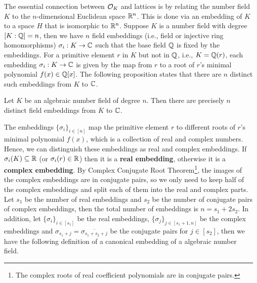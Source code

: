 \documentclass[../main.tex]{subfiles}
\begin{document}
The essential connection between $\mathcal{O}_K$ and lattices is by relating the number field $K$ to the $n$-dimensional Euclidean space $\mathbb{R}^n$. This is done via an embedding of $K$ to a space $H$ that is isomorphic to $\mathbb{R}^n$. Suppose $K$ is a number field with degree $[K:\mathbb{Q}]=n$, then we have $n$ field embeddings (i.e., field or injective ring homomorphisms) $\sigma_i: K \rightarrow \mathbb{C}$ such that the base field $\mathbb{Q}$ is fixed by the embeddings. For a primitive element $r$ in $K$ but not in $\mathbb{Q}$, i.e., $K=\Q(r)$, each embedding $\sigma_i: K \rightarrow \mathbb{C}$ is given by the map from $r$ to a root of $r$'s minimal polynomial $f(x) \in \Q[x]$. The following proposition states that there are $n$ distinct such embeddings from $K$ to $\mathbb{C}$. 

\iffalse
By definition of the embeddings, we have 
\begin{enumerate}
    \item for a number field $K=\Q(r)$, each embedding $\sigma_i$ is uniquely determined by its image $\sigma_i(r)$, 
    \item if $f(x) \in \Q[x]$, then each $\sigma_i$ maps a root of $f(x)$ to another root of it i.e., if $f(r)=0$ then $f(\sigma_i(r))=0$, because $f(\sigma_i(r)) = \sigma_i(f(r)) = \sigma_i(0) = 0$ as ring homomorphism fixes 0.  
\end{enumerate}

Due to the above, the following proposition can be proved. 
\fi 


\begin{proposition}
Let $K$ be an algebraic number field of degree $n$. Then there are precisely $n$ distinct field embeddings from $K$ to $\mathbb{C}$. 
\end{proposition}

The embeddings $\{\sigma_i\}_{i \in [n]}$ map the primitive element $r$ to different roots of $r$'s minimal polynomial $f(x)$, which is a collection of real and complex numbers. Hence, we can distinguish these embeddings as real and complex embeddings. 
\reversemarginpar
{}
If $\sigma_i(K) \subseteq \mathbb{R}$ (or $\sigma_i(r) \in \mathbb{R}$) then it is a \textbf{real embedding}, otherwise it is a \textbf{complex embedding}. By Complex Conjugate Root Theorem\footnote{The complex roots of real coefficient polynomials are in conjugate pairs.},  the images of the complex embeddings are in conjugate pairs, so we only need to keep half of the complex embeddings and split each of them into the real and complex parts. Let $s_1$ be the number of real embeddings and $s_2$ be the number of conjugate pairs of complex embeddings, then the total number of embeddings is $n=s_1 + 2s_2$. In addition, let $\{\sigma_i\}_{i \in [s_1]}$ be the real embeddings, $\{\sigma_j\}_{j \in [s_1+1, n]}$ be the complex embeddings and $\sigma_{s_1 + j} = \overline{\sigma_{s_1 + s_2 + j}}$ be the conjugate pairs for $j \in [s_2]$, then we have the following definition of a canonical embedding of a algebraic number field. 
\end{document}
